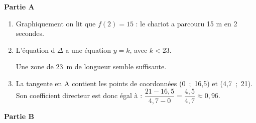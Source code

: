 
\medskip

\begin{center}\textbf{Partie A} \end{center}

\begin{enumerate}
\item %
Graphiquement on lit que $f(2) = 15$ : le chariot a parcouru 15 m en 2 secondes.
\item %
L'équation d $\Delta$ a une équation $y = k$, avec $k < 23$.

Une zone de 23~m de longueur  semble suffisante.

\item %
La tangente en A contient les points de coordonnées (0~;~16,5) et (4,7~;~21). Son coefficient directeur est donc égal à : $\dfrac{21 - 16,5}{4,7 - 0} = \dfrac{4,5}{4,7} \approx 0,96$.
\end{enumerate}

\begin{center}\textbf{Partie B} \end{center}

